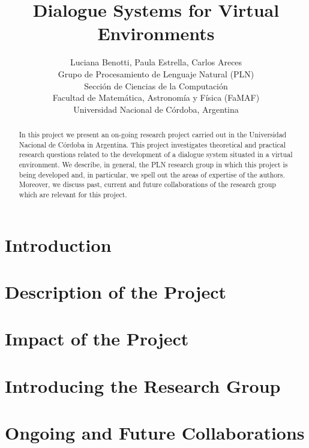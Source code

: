 \documentclass[11pt,letterpaper]{article}
\title{Dialogue Systems for Virtual Environments}
\author{Luciana Benotti, Paula Estrella, Carlos Areces \\
 Grupo de Procesamiento de Lenguaje Natural (PLN) \\
Secci\'on de Ciencias de la Computaci\'on \\
Facultad de Matem\'atica, Astronom\'ia y F\'isica (FaMAF) \\
Universidad Nacional de C\'ordoba, Argentina \\
}
\date{}
\begin{document}
\maketitle
\begin{abstract}
In this project we present an on-going research project carried out in the Universidad Nacional de C\'ordoba in Argentina. This project investigates theoretical and practical research questions related to the development of a dialogue system situated in a virtual environment. We describe, in general, the PLN research group in which this project is being developed and, in particular, we spell out the areas of expertise of the authors. Moreover, we discuss past, current and future collaborations of the research group which are relevant for this project.
\end{abstract}

\section{Introduction}\label{intro}


\section{Description of the Project}\label{description}


\section{Impact of the Project}\label{impact}


\section{Introducing the Research Group}\label{group}


\section{Ongoing and Future Collaborations}\label{collaboration}




\end{document}
